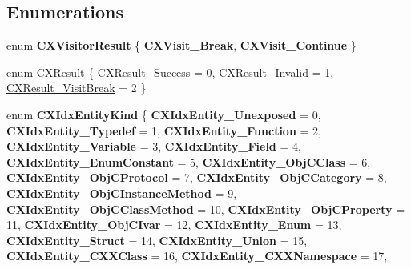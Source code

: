 \subsection*{Enumerations}
\begin{DoxyCompactItemize}
\item 
\mbox{\label{group__CINDEX__HIGH_ga4b763faa98fe78195c06f74745a1e6b4}} 
enum {\bfseries C\+X\+Visitor\+Result} \{ {\bfseries C\+X\+Visit\+\_\+\+Break}, 
{\bfseries C\+X\+Visit\+\_\+\+Continue}
 \}
\item 
enum \mbox{\hyperlink{group__CINDEX__HIGH_ga59185777d9788da5d983cc0c7c8977bf}{C\+X\+Result}} \{ \mbox{\hyperlink{group__CINDEX__HIGH_gga59185777d9788da5d983cc0c7c8977bfadc04f4b21eabbddf3465b4e8cf684b97}{C\+X\+Result\+\_\+\+Success}} = 0, 
\mbox{\hyperlink{group__CINDEX__HIGH_gga59185777d9788da5d983cc0c7c8977bfafeb3e2b0d7128e99709d10d5ced9470b}{C\+X\+Result\+\_\+\+Invalid}} = 1, 
\mbox{\hyperlink{group__CINDEX__HIGH_gga59185777d9788da5d983cc0c7c8977bfa1a0d552a23b857cb129e0211bc9fb1dd}{C\+X\+Result\+\_\+\+Visit\+Break}} = 2
 \}
\item 
\mbox{\label{group__CINDEX__HIGH_gaeabdc51cf762443531dfdd92b0e15b04}} 
enum {\bfseries C\+X\+Idx\+Entity\+Kind} \{ \newline
{\bfseries C\+X\+Idx\+Entity\+\_\+\+Unexposed} = 0, 
{\bfseries C\+X\+Idx\+Entity\+\_\+\+Typedef} = 1, 
{\bfseries C\+X\+Idx\+Entity\+\_\+\+Function} = 2, 
{\bfseries C\+X\+Idx\+Entity\+\_\+\+Variable} = 3, 
\newline
{\bfseries C\+X\+Idx\+Entity\+\_\+\+Field} = 4, 
{\bfseries C\+X\+Idx\+Entity\+\_\+\+Enum\+Constant} = 5, 
{\bfseries C\+X\+Idx\+Entity\+\_\+\+Obj\+C\+Class} = 6, 
{\bfseries C\+X\+Idx\+Entity\+\_\+\+Obj\+C\+Protocol} = 7, 
\newline
{\bfseries C\+X\+Idx\+Entity\+\_\+\+Obj\+C\+Category} = 8, 
{\bfseries C\+X\+Idx\+Entity\+\_\+\+Obj\+C\+Instance\+Method} = 9, 
{\bfseries C\+X\+Idx\+Entity\+\_\+\+Obj\+C\+Class\+Method} = 10, 
{\bfseries C\+X\+Idx\+Entity\+\_\+\+Obj\+C\+Property} = 11, 
\newline
{\bfseries C\+X\+Idx\+Entity\+\_\+\+Obj\+C\+Ivar} = 12, 
{\bfseries C\+X\+Idx\+Entity\+\_\+\+Enum} = 13, 
{\bfseries C\+X\+Idx\+Entity\+\_\+\+Struct} = 14, 
{\bfseries C\+X\+Idx\+Entity\+\_\+\+Union} = 15, 
\newline
{\bfseries C\+X\+Idx\+Entity\+\_\+\+C\+X\+X\+Class} = 16, 
{\bfseries C\+X\+Idx\+Entity\+\_\+\+C\+X\+X\+Namespace} = 17, 

\end{DoxyCompactItemize}
